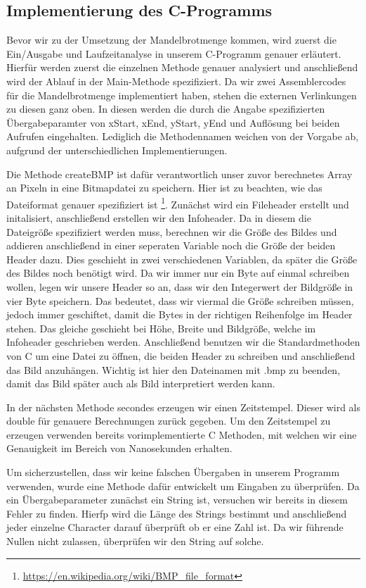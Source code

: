 \documentclass[11pt]{scrartcl}
\begin{document}
\subsection{Implementierung des C-Programms}
Bevor wir zu der Umsetzung der Mandelbrotmenge kommen, wird zuerst die Ein/Ausgabe und Laufzeitanalyse in unserem C-Programm genauer erläutert.
Hierfür werden zuerst die einzelnen Methode genauer analysiert und anschließend wird der Ablauf in der Main-Methode spezifiziert.
Da wir zwei Assemblercodes für die Mandelbrotmenge implementiert haben, stehen die externen Verlinkungen zu diesen ganz oben.
In diesen werden die durch die Angabe spezifizierten Übergabeparamter von xStart, xEnd, yStart, yEnd und Auflösung bei beiden Aufrufen eingehalten.
Lediglich die Methodennamen weichen von der Vorgabe ab, aufgrund der unterschiedlichen Implementierungen.

Die Methode createBMP ist dafür verantwortlich unser zuvor berechnetes Array an Pixeln in eine Bitmapdatei zu speichern.
Hier ist zu beachten, wie das Dateiformat genauer spezifiziert ist \footnote{\label{not:wikiBMP}\url{https://en.wikipedia.org/wiki/BMP_file_format}}.
Zunächst wird ein Fileheader erstellt und initalisiert, anschließend erstellen wir den Infoheader.
Da in diesem die Dateigröße spezifiziert werden muss, berechnen wir die Größe des Bildes und addieren anschließend in einer seperaten Variable noch die Größe der beiden Header dazu.
Dies geschieht in zwei verschiedenen Variablen, da später die Größe des Bildes noch benötigt wird.
Da wir immer nur ein Byte auf einmal schreiben wollen, legen wir unsere Header so an, dass wir den Integerwert der Bildgröße in vier Byte speichern.
Das bedeutet, dass wir viermal die Größe schreiben müssen, jedoch immer geschiftet, damit die Bytes in der richtigen Reihenfolge im Header stehen.
Das gleiche geschieht bei Höhe, Breite und Bildgröße, welche im Infoheader geschrieben werden.
Anschließend benutzen wir die Standardmethoden von C um eine Datei zu öffnen, die beiden Header zu schreiben und anschließend das Bild anzuhängen.
Wichtig ist hier den Dateinamen mit .bmp zu beenden, damit das Bild später auch als Bild interpretiert werden kann.

In der nächsten Methode secondes erzeugen wir einen Zeitstempel.
Dieser wird als double für genauere Berechnungen zurück gegeben.
Um den Zeitstempel zu erzeugen verwenden bereits vorimplementierte C Methoden, mit welchen wir eine Genauigkeit im Bereich von Nanosekunden erhalten.

Um sicherzustellen, dass wir keine falschen Übergaben in unserem Programm verwenden, wurde eine Methode dafür entwickelt um Eingaben zu überprüfen.
Da ein Übergabeparameter zunächst ein String ist, versuchen wir bereits in diesem Fehler zu finden.
Hierfp wird die Länge des Strings bestimmt und anschließend jeder einzelne Character darauf überprüft ob er eine Zahl ist.
Da wir führende Nullen nicht zulassen, überprüfen wir den String auf solche.
\end{document}
